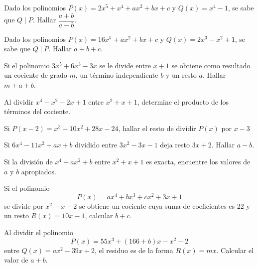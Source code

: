 \showLine
\begin{multicols}{2}

    \begin{exercise}
        Dado los polinomios $P(x) = 2x^5 + x^4 + ax^2 + bx + c$ y $Q(x) = x^4 - 1$, se sabe que $Q \mid P$.
        Hallar $\dfrac{a + b}{a - b}$.
    \end{exercise}

    \begin{exercise}
        Dado los polinomios $P(x) = 16x^5 + ax^2 + bx + c$ y $Q(x) = 2 x^3 - x^2 + 1$, se sabe que $Q \mid P$.
        Hallar $a + b + c$.
    \end{exercise}

    \begin{exercise}
        Si el polinomio $3x^5 + 6x^3 - 3x$ se le divide entre $x + 1$ se obtiene como resultado un cociente de grado $m$, un término independiente $b$ y un resto $a$.
        Hallar $m + a + b$.
    \end{exercise}

    \begin{exercise}
        Al dividir $x^4 - x^2 - 2x + 1$ entre $x^2 + x + 1$, determine el producto de los términos del cociente.
    \end{exercise}

    \begin{exercise}
        Si $P(x - 2) = x^3 - 10x^2 + 28x - 24$, hallar el resto de dividir $P(x)$ por $x - 3$
    \end{exercise}

    \begin{exercise}
        Si $6x^4 - 11x^2 + ax + b$ dividido entre $3x^2 - 3x - 1$ deja resto $3x + 2$.
        Hallar $a - b$.
    \end{exercise}

    \begin{exercise}
        Si la división de $x^4 + ax^2 + b$ entre $x^2 + x + 1$ es exacta, encuentre los valores de $a$ y $b$ apropiados.
    \end{exercise}

    \begin{exercise}
        Si el polinomio
        \[
            P(x) = ax^4 + bx^3 + cx^2 + 3x + 1
        \]
        se divide por $x^2 - x + 2$ se obtiene un cociente cuya suma de coeficientes es 22 y un resto $R(x) = 10x - 1$, calcular $b + c$.
    \end{exercise}

    \begin{exercise}
        Al dividir el polinomio
        \[
            P(x) = 55x^3 + (166 + b)x - x^2 - 2
        \]
        entre $Q(x) = ax^2 - 39x + 2$, el residuo es de la forma $R(x) = mx$.
        Calcular el valor de $a + b$.
    \end{exercise}


\end{multicols}
